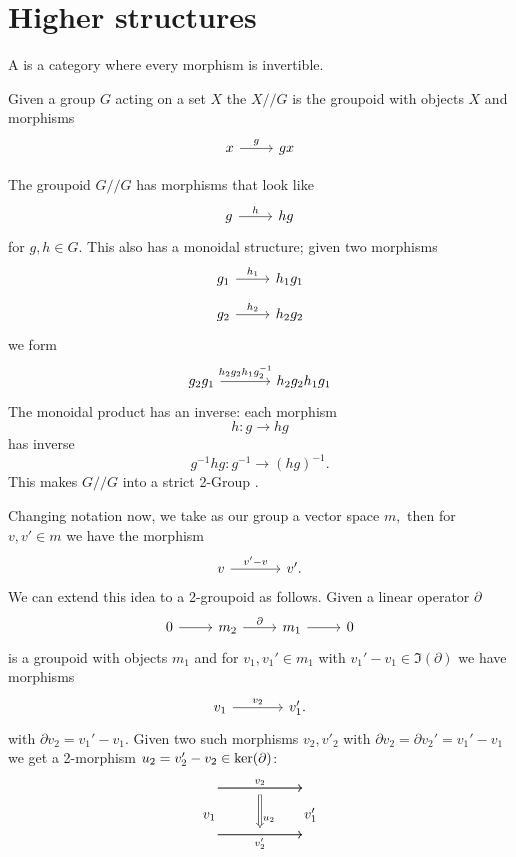 \documentclass[12pt]{article}
\begin{document}
\section{Higher structures}


A  is a category where every morphism is invertible.

Given a group $G$ acting on a set $X$
the  $X//G$
is the groupoid with objects $X$ and morphisms
\[\begin{tikzcd} x \arrow{r}{g} & gx \end{tikzcd} \]

The groupoid $G//G$ has morphisms that look like
\[\begin{tikzcd} g \arrow{r}{h} & hg \end{tikzcd} \]
for $g, h\in G.$
This also has a monoidal structure; given two
morphisms
\[\begin{tikzcd}[row sep=small]
g_1 \arrow{r}{h_1} & h_1g_1 \\
g_2 \arrow{r}{h_2} & h_2g_2
\end{tikzcd} \]
we form
\[\begin{tikzcd}[row sep=large, column sep = large]
g_2 g_1 \arrow{r}{h_2 g_2 h_1 g_2^{-1}} & h_2 g_2 h_1 g_1 
\end{tikzcd} \]
The monoidal product has an inverse: 
each morphism 
$$h:g\to hg$$ 
has inverse 
$$g^{-1}hg : g^{-1}\to (hg)^{-1}.$$
This makes $G//G$ into a strict 2-Group \cite{Roberts2007}.

\def\bdy{\partial}

Changing notation now, we take as our group a vector space $m,$
then for $v,v'\in m$ we have the morphism
\[\begin{tikzcd}[column sep = large]
v \arrow{r}{v'-v} & v'. \end{tikzcd} \]
We can extend this idea to a 2-groupoid as follows.
Given a linear operator $\bdy$
\[\begin{tikzcd} 0 \arrow{r} & m_2 \arrow{r}{\bdy} & m_1 \arrow{r} & 0 \end{tikzcd} \]
is a groupoid with objects $m_1$ and
for $v_1, v_1'\in m_1$ with $v_1'-v_1 \in \Im(\bdy)$
we have morphisms
\[\begin{tikzcd}[column sep = large]
v_1 \arrow{r}{v_2} & v_1'. \end{tikzcd} \]
with $\bdy v_2=v_1'-v_1.$
Given two such morphisms $v_2, v'_2$ with $\bdy v_2=\bdy v_2'=v_1'-v_1$ 
we get a 2-morphism $u_2=v_2'-v_2\in\Ker(\bdy)$:
$$
\begin{tikzcd}[column sep = small, row sep = tiny]
\ \arrow{rr}[]{v_2} \arrow{rr}[name=U,below]{} & \ & \   \\
v_1         & \ \ \ \ {}_{u_2}              & v_1' \\
\ \arrow{rr}[below]{v_2'} \arrow{rr}[name=D]{}  &  \     & \   \\
\arrow[Rightarrow,to path=(U) -- (D),left]{}
\end{tikzcd}
$$
\end{document}
